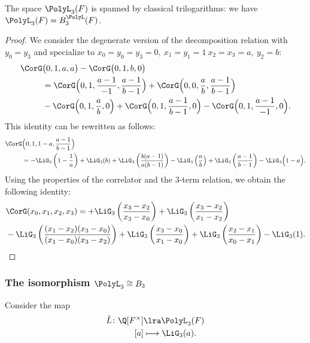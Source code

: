 \documentclass[a4paper]{amsart}
\begin{document}
\begin{proposition}\label{prop: G3 spanned by trilogs} The space $\PolyL_3(F)$ is spanned by classical trilogarithms: we have $\PolyL_3(F)=B_3^{\PolyL}(F)$.
\end{proposition}
\begin{proof}
We consider the degenerate version of the decomposition relation with $y_0=y_3$ and specialize to $x_0=y_0=y_3=0,\: x_1=y_1=1 \: x_2=x_3=a, \: y_2=b$:
\begin{align*}
\CorG&\bigl(0,1 ,a ,a\bigr)-\CorG\bigl(0, 1, b, 0\bigr)\\
&=\CorG\Bigl(0,1 , \frac{a-1}{-1} , \frac{a-1}{b-1}\Bigr)+\CorG\Bigl(0,0,\frac{a}{b}, \frac{a-1}{b-1}\Bigr)\\
&-\CorG\Bigl(0,1 ,\frac{a}{b} , 0\Bigr)+\CorG\Bigl(0,1 , \frac{a-1}{b-1} , 0\Bigr)-\CorG\Bigl(0,1, \frac{a-1}{-1} , 0\Bigr).
\end{align*}
This identity can be rewritten as follows:
\begin{align*}
\CorG&\Bigl(0,1, 1-a , \frac{a-1}{b-1}\Bigr)\\
&=-\LiG_3\left(1-\frac{1}{a}\right)
+\LiG_3(b)
+\LiG_3\left(\frac{b(a-1)}{a(b-1)}\right)
-\LiG_3\left(\frac{a}{b}\right)
+\LiG_3\left(\frac{a-1}{b-1}\right)
-\LiG_3\Bigl(1-a \Bigr).
\end{align*}
Using the properties of the correlator and the $3$-term relation, we obtain the following identity:
\begin{equation}\label{eqn: correlator via trilogs}
\begin{aligned}
&\CorG(x_0,x_1, x_2, x_3) =+\LiG_3\left(\frac{x_3 - x_2}{x_3 - x_0}\right)+\LiG_3\left(\frac{x_3 - x_2}{x_1 - x_2}\right) \\
&-\LiG_3\left(\frac{(x_1 - x_2)(x_3 - x_0)}{(x_1 - x_0)(x_3 - x_2)}\right) + 
   \LiG_3\left(\frac{x_3 - x_0}{x_1 - x_0}\right)+\LiG_3\left(\frac{x_2 - x_1}{x_0 - x_1}\right)- \LiG_3(1).
\end{aligned}
\end{equation}
\end{proof}



\subsubsection{The isomorphism $\PolyL_3\cong B_3$}
Consider the map 
\begin{equation} \label{eqn: map from B_3 to G_3}
\begin{aligned}
  \tilde{L} \colon\Q[F^{\times}] &\lra \PolyL_3(F) \\
  [a] &\longmapsto \LiG_3(a).\end{aligned}
\end{equation}
\end{document}
